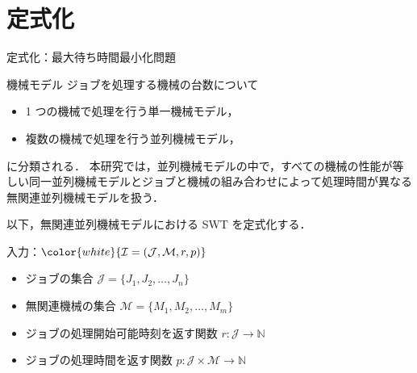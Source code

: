\documentclass[dvipdfmx]{beamer}
\begin{document}
    \section{定式化}
    \begin{frame}{定式化：最大待ち時間最小化問題}
      \begin{block}{機械モデル}
        ジョブを処理する機械の台数について
        \begin{itemize}
          \item 1 つの機械で処理を行う\alert{単一機械モデル}，
          \item 複数の機械で処理を行う\alert{並列機械モデル}，
        \end{itemize}
        に分類される．
        本研究では，並列機械モデルの中で，すべての機械の性能が等しい\alert{同一並列機械モデル}とジョブと機械の組み合わせによって処理時間が異なる\alert{無関連並列機械モデル}を扱う．
      \end{block}

      以下，無関連並列機械モデルにおける SWT を定式化する．
      \begin{block}{入力：$\color{white}{\mathcal{I} = (\mathcal{J}, \mathcal{M}, r, p)}$}
        \begin{itemize}
          \item {ジョブの集合 $\mathcal{J} = \{J_1,J_2,\ldots,J_n\}$}
          \item {無関連機械の集合 $\mathcal{M} = \{M_1,M_2,\ldots,M_m\}$}
          \item {ジョブの処理開始可能時刻を返す関数 $r : \mathcal{J} \to \mathbb{N}$}
          \item {ジョブの処理時間を返す関数 $p : \mathcal{J} \times \mathcal{M} \to \mathbb{N}$}
        \end{itemize}
      \end{block}
    \end{frame}
\end{document}
